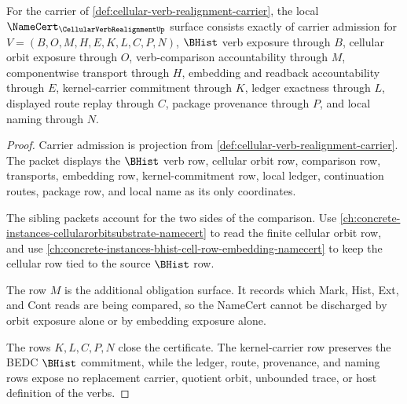 \begin{theorem}
\label{thm:cellular-verb-realignment-namecert-obligations}
For the carrier of \autoref{def:cellular-verb-realignment-carrier}, the local $\NameCert_{\CellularVerbRealignmentUp}$ surface consists exactly of carrier admission for $V=(B,O,M,H,E,K,L,C,P,N)$, $\BHist$ verb exposure through $B$, cellular orbit exposure through $O$, verb-comparison accountability through $M$, componentwise transport through $H$, embedding and readback accountability through $E$, kernel-carrier commitment through $K$, ledger exactness through $L$, displayed route replay through $C$, package provenance through $P$, and local naming through $N$.
\end{theorem}
\begin{proof}
Carrier admission is projection from \autoref{def:cellular-verb-realignment-carrier}. The packet displays the $\BHist$ verb row, cellular orbit row, comparison row, transports, embedding row, kernel-commitment row, local ledger, continuation routes, package row, and local name as its only coordinates.

The sibling packets account for the two sides of the comparison. Use \autoref{ch:concrete-instances-cellularorbitsubstrate-namecert} to read the finite cellular orbit row, and use \autoref{ch:concrete-instances-bhist-cell-row-embedding-namecert} to keep the cellular row tied to the source $\BHist$ row.

The row $M$ is the additional obligation surface. It records which Mark, Hist, Ext, and Cont reads are being compared, so the NameCert cannot be discharged by orbit exposure alone or by embedding exposure alone.

The rows $K,L,C,P,N$ close the certificate. The kernel-carrier row preserves the BEDC $\BHist$ commitment, while the ledger, route, provenance, and naming rows expose no replacement carrier, quotient orbit, unbounded trace, or host definition of the verbs.
\end{proof}

